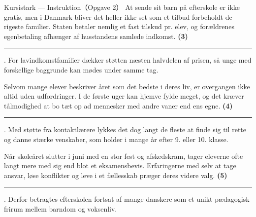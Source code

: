\begin{emailbox}{Kursistark --- Instruktion（Opgave 2）}
\vspace{0.25em}
At sende sit barn på efterskole er ikke gratis, men i Danmark bliver det heller ikke set som et tilbud forbeholdt de rigeste familier. Staten betaler nemlig et fast tilskud pr. elev, og forældrenes egenbetaling afhænger af husstandens samlede indkomst. \textbf{(3)}\ \rule{1.8cm}{0.4pt}. For lavindkomstfamilier dækker støtten næsten halvdelen af prisen, så unge med forskellige baggrunde kan mødes under samme tag.

\vspace{0.25em}
Selvom mange elever beskriver året som det bedste i deres liv, er overgangen ikke altid uden udfordringer. I de første uger kan hjemve fylde meget, og det kræver tålmodighed at bo tæt op ad mennesker med andre vaner end ens egne. \textbf{(4)}\ \rule{1.8cm}{0.4pt}. Med støtte fra kontaktlærere lykkes det dog langt de fleste at finde sig til rette og danne stærke venskaber, som holder i mange år efter 9. eller 10. klasse.

\vspace{0.25em}
Når skoleåret slutter i juni med en stor fest og afskedskram, tager eleverne ofte langt mere med sig end blot et eksamensbevis. Erfaringerne med selv at tage ansvar, løse konflikter og leve i et fællesskab præger deres videre valg. \textbf{(5)}\ \rule{1.8cm}{0.4pt}. Derfor betragtes efterskolen fortsat af mange danskere som et unikt pædagogisk frirum mellem barndom og voksenliv.
\end{emailbox}

